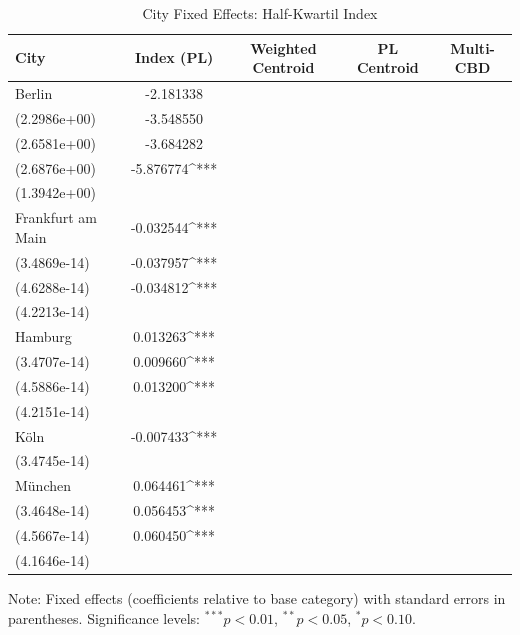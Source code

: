 \begin{table}[h!]
\centering
\caption{City Fixed Effects: Half-Kwartil Index}
\label{tab:city_fe_index_hk}
\begin{tabular}{lcccc}
\toprule
City & Index (PL) & Weighted Centroid & PL Centroid & Multi-CBD \\
\midrule
Berlin & -2.181338 \\ (2.2986e+00) & -3.548550 \\ (2.6581e+00) & -3.684282 \\ (2.6876e+00) & -5.876774^{***} \\ (1.3942e+00) \\
Frankfurt am Main & -0.032544^{***} \\ (3.4869e-14) & -0.037957^{***} \\ (4.6288e-14) & -0.034812^{***} \\ (4.2213e-14) &  \\
Hamburg & 0.013263^{***} \\ (3.4707e-14) & 0.009660^{***} \\ (4.5886e-14) & 0.013200^{***} \\ (4.2151e-14) &  \\
Köln & -0.007433^{***} \\ (3.4745e-14) &  &  &  \\
München & 0.064461^{***} \\ (3.4648e-14) & 0.056453^{***} \\ (4.5667e-14) & 0.060450^{***} \\ (4.1646e-14) &  \\
\bottomrule
\end{tabular}
\begin{tablenotes}[para]
\small
Note: Fixed effects (coefficients relative to base category) with standard errors in parentheses.
Significance levels: $^{***} p<0.01$, $^{**} p<0.05$, $^{*} p<0.10$.
\end{tablenotes}
\end{table}